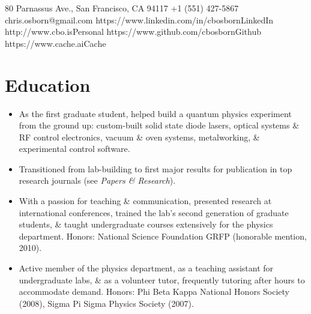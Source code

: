 \documentclass{resume}
\begin{document}
\contact
	{80 Parnassus Ave., San Francisco, CA 94117}
	{+1 (551) 427-5867}
	{chris.osborn@gmail.com}
\sites
	{https://www.linkedin.com/in/cbosborn}{LinkedIn}
	{http://www.cbo.is}{Personal}
	{https://www.github.com/cbosborn}{Github}
	{https://www.cache.ai}{Cache}
\section{Education}
	\begin{itemize}
	\item As the first graduate student, helped build a quantum physics experiment from the ground up: custom-built solid state diode lasers, optical systems \& RF control electronics, vacuum \& oven systems, metalworking, \& experimental control software.
	\item Transitioned from lab-building to first major results for publication in top research journals (see \textit{Papers \& Research}).
	\item With a passion for teaching \& communication, presented research at international conferences, trained the lab's second generation of graduate students, \& taught undergraduate courses extensively for the physics department.
	\note
		{Honors:}
		{National Science Foundation GRFP (honorable mention, 2010).}
	\end{itemize}

	\begin{itemize}
		\item Active member of the physics department, as a teaching assistant for undergraduate labs, \& as a volunteer tutor, frequently tutoring after hours to accommodate demand.
		\note
			{Honors:}
			{Phi Beta Kappa National Honors Society (2008), Sigma Pi Sigma Physics Society (2007).}
	\end{itemize}
\end{document}
